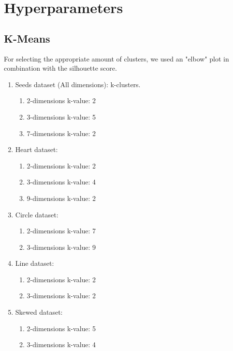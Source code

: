 \chapter{Hyperparameters}
\section{K-Means}
For selecting the appropriate amount of clusters, we used an "elbow" plot in combination with the silhouette score.
\begin{enumerate}
  \item Seeds dataset (All dimensions): k-clusters.
  \begin{enumerate}
      \item 2-dimensions k-value: 2
      \item 3-dimensions k-value: 5
      \item 7-dimensions k-value: 2
  \end{enumerate}
      \item Heart dataset:
      \begin{enumerate}
          \item 2-dimensions k-value: 2
          \item 3-dimensions k-value: 4
          \item 9-dimensions k-value: 2
      \end{enumerate}
      \item Circle dataset:
      \begin{enumerate}
          \item 2-dimensions k-value: 7
          \item 3-dimensions k-value: 9
      \end{enumerate}
      \item Line dataset:
      \begin{enumerate}
          \item 2-dimensions k-value: 2
          \item 3-dimensions k-value: 2
      \end{enumerate}
      \item Skewed dataset:
      \begin{enumerate}
          \item 2-dimensions k-value: 5
          \item 3-dimensions k-value: 4
      \end{enumerate}
  \end{enumerate}

\newpage
